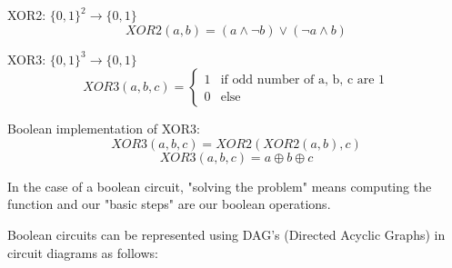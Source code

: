 \begin{example}
    
    XOR2: $\{0,1\}^2 \rightarrow \{0,1\}$
    \[
        XOR2(a, b) = (a \land \lnot b) \lor (\lnot a \land b)
    \]

    XOR3: $\{0,1\}^3 \rightarrow \{0,1\}$
    \begin{equation}
        XOR3(a, b, c) = 
        \begin{cases}
            1 & \text{if odd number of a, b, c are 1} \\
            0 & \text{else}
        \end{cases}
    \end{equation}

    Boolean implementation of XOR3:
    \[
        XOR3(a, b, c) = XOR2(XOR2(a, b), c)  
    \]
    \[
      XOR3(a, b, c) = a \oplus b \oplus c
    \]
\end{example}

In the case of a boolean circuit, "solving the problem" means computing the function and our "basic steps" are our boolean operations. 

Boolean circuits can be represented using DAG's (Directed Acyclic Graphs) in circuit diagrams as follows: 
\begin{center}
\end{center}




